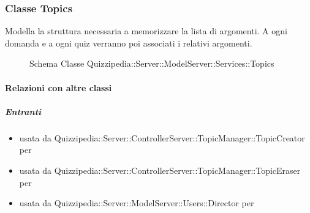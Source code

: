 \subsubsection{Classe Topics}
Modella la struttura necessaria a memorizzare la lista di argomenti. A ogni domanda e a ogni quiz verranno poi associati i relativi argomenti.
\begin{figure}[H]
\centering
\noindent{}
\caption[Schema Classe Topics]{Schema Classe Quizzipedia::Server::ModelServer::Services::Topics}
\end{figure}
\paragraph{Relazioni con altre classi}
\subparagraph{Entranti}
\begin{itemize}
\item usata da Quizzipedia::Server::ControllerServer::TopicManager::TopicCreator per 
\item usata da Quizzipedia::Server::ControllerServer::TopicManager::TopicEraser per 
\item usata da Quizzipedia::Server::ModelServer::Users::Director per 
\end{itemize}
